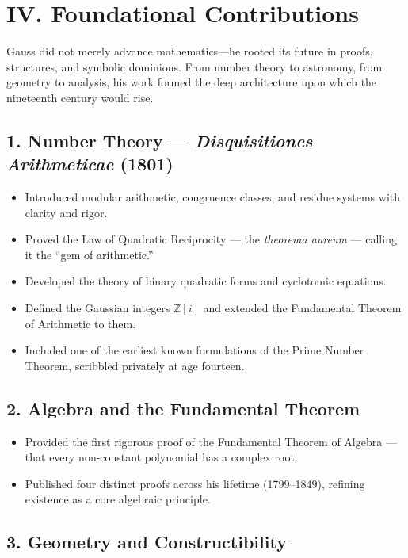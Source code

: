 \documentclass[9pt]{article}
\begin{document}
\newpage

\section*{IV. Foundational Contributions}

Gauss did not merely advance mathematics—he rooted its future in proofs, structures, and symbolic dominions. From number theory to astronomy, from geometry to analysis, his work formed the deep architecture upon which the nineteenth century would rise.

\subsection*{1. Number Theory — \textit{Disquisitiones Arithmeticae} (1801)}

\begin{itemize}
  \item Introduced modular arithmetic, congruence classes, and residue systems with clarity and rigor.
  \item Proved the Law of Quadratic Reciprocity — the \textit{theorema aureum} — calling it the “gem of arithmetic.”
  \item Developed the theory of binary quadratic forms and cyclotomic equations.
  \item Defined the Gaussian integers $\mathbb{Z}[i]$ and extended the Fundamental Theorem of Arithmetic to them.
  \item Included one of the earliest known formulations of the Prime Number Theorem, scribbled privately at age fourteen.
\end{itemize}

\subsection*{2. Algebra and the Fundamental Theorem}

\begin{itemize}
  \item Provided the first rigorous proof of the Fundamental Theorem of Algebra — that every non-constant polynomial has a complex root.
  \item Published four distinct proofs across his lifetime (1799–1849), refining existence as a core algebraic principle.
\end{itemize}

\subsection*{3. Geometry and Constructibility}
\end{document}
